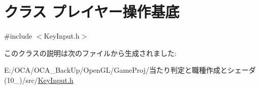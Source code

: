 \hypertarget{class_xE3_x83_x97_xE3_x83_xAC_xE3_x82_xA4_xE3_x83_xA4_xE3_x83_xBC_xE6_x93_x8D_xE4_xBD_x9C_xE5_x9F_xBA_xE5_xBA_x95}{\section{クラス プレイヤー操作基底}
\label{class_xE3_x83_x97_xE3_x83_xAC_xE3_x82_xA4_xE3_x83_xA4_xE3_x83_xBC_xE6_x93_x8D_xE4_xBD_x9C_xE5_x9F_xBA_xE5_xBA_x95}
}


{\ttfamily \#include $<$Key\-Input.\-h$>$}



このクラスの説明は次のファイルから生成されました\-:\begin{DoxyCompactItemize}
\item 
E\-:/\-O\-C\-A/\-O\-C\-A\-\_\-\-Back\-Up/\-Open\-G\-L/\-Game\-Proj/当たり判定と職種作成とシェーダ(10\-\_)/src/\hyperlink{_key_input_8h}{Key\-Input.\-h}\end{DoxyCompactItemize}
